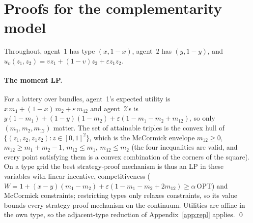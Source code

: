\section{Proofs for the complementarity model}
\label{app:eps}

Throughout, agent~1 has type $(x,1-x)$, agent~2 has $(y,1-y)$, and $u_v(z_1,z_2)=vz_1+(1-v)z_2+\varepsilon z_1z_2$.

\paragraph{The moment LP.} For a lottery over bundles, agent~1's expected utility is
$x\,m_1+(1-x)\,m_2+\varepsilon\,m_{12}$ and agent~2's is
$y(1-m_1)+(1-y)(1-m_2)+\varepsilon(1-m_1-m_2+m_{12})$, so only $(m_1,m_2,m_{12})$ matter. The set of
attainable triples is the convex hull of $\{(z_1,z_2,z_1z_2):z\in[0,1]^2\}$, which is the McCormick
envelope $m_{12}\ge0$, $m_{12}\ge m_1+m_2-1$, $m_{12}\le m_1$, $m_{12}\le m_2$ (the four inequalities are
valid, and every point satisfying them is a convex combination of the corners of the square). On
a type grid the best strategy-proof mechanism is thus an LP in these variables with linear
incentive, competitiveness ($W=1+(x-y)(m_1-m_2)+\varepsilon(1-m_1-m_2+2m_{12})\ge\alpha\,\mathrm{OPT}$) and
McCormick constraints; restricting types only relaxes constraints, so its value bounds every
strategy-proof mechanism on the continuum. Utilities are affine in the own type, so the
adjacent-type reduction of Appendix~\ref{app:repl} applies. \qed

